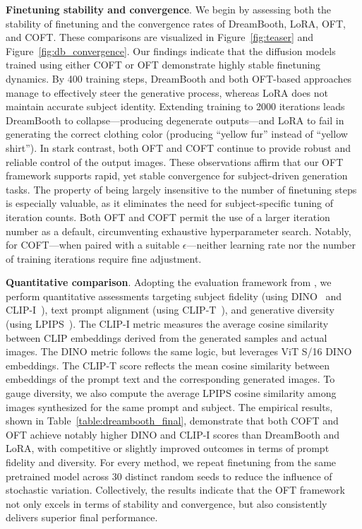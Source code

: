 \textbf{Finetuning stability and convergence}. We begin by assessing both the stability of finetuning and the convergence rates of DreamBooth, LoRA, OFT, and COFT. These comparisons are visualized in Figure~\ref{fig:teaser} and Figure~\ref{fig:db_convergence}. Our findings indicate that the diffusion models trained using either COFT or OFT demonstrate highly stable finetuning dynamics. By 400 training steps, DreamBooth and both OFT-based approaches manage to effectively steer the generative process, whereas LoRA does not maintain accurate subject identity. Extending training to 2000 iterations leads DreamBooth to collapse—producing degenerate outputs—and LoRA to fail in generating the correct clothing color (producing “yellow fur” instead of “yellow shirt”). In stark contrast, both OFT and COFT continue to provide robust and reliable control of the output images. These observations affirm that our OFT framework supports rapid, yet stable convergence for subject-driven generation tasks. The property of being largely insensitive to the number of finetuning steps is especially valuable, as it eliminates the need for subject-specific tuning of iteration counts. Both OFT and COFT permit the use of a larger iteration number as a default, circumventing exhaustive hyperparameter search. Notably, for COFT—when paired with a suitable $\epsilon$—neither learning rate nor the number of training iterations require fine adjustment.

\textbf{Quantitative comparison}. Adopting the evaluation framework from \cite{ruiz2023dreambooth}, we perform quantitative assessments targeting subject fidelity (using DINO~\cite{caron2021emerging} and CLIP-I~\cite{radford2021learning}), text prompt alignment (using CLIP-T~\cite{radford2021learning}), and generative diversity (using LPIPS~\cite{zhang2018unreasonable}). The CLIP-I metric measures the average cosine similarity between CLIP embeddings derived from the generated samples and actual images. The DINO metric follows the same logic, but leverages ViT S/16 DINO embeddings. The CLIP-T score reflects the mean cosine similarity between embeddings of the prompt text and the corresponding generated images. To gauge diversity, we also compute the average LPIPS cosine similarity among images synthesized for the same prompt and subject. The empirical results, shown in Table~\ref{table:dreambooth_final}, demonstrate that both COFT and OFT achieve notably higher DINO and CLIP-I scores than DreamBooth and LoRA, with competitive or slightly improved outcomes in terms of prompt fidelity and diversity. For every method, we repeat finetuning from the same pretrained model across 30 distinct random seeds to reduce the influence of stochastic variation. Collectively, the results indicate that the OFT framework not only excels in terms of stability and convergence, but also consistently delivers superior final performance.

